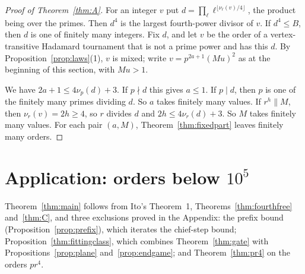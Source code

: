 \documentclass[11pt]{amsart}
\theoremstyle{definition}
\theoremstyle{remark}
\begin{document}
\begin{proof}[Proof of Theorem~\ref{thm:A}]
For an integer $v$ put $d=\prod_\ell\ell^{\lfloor\nu_\ell(v)/4\rfloor}$, the product being over the primes. Then $d^4$ is the largest fourth-power divisor of $v$. If $d^4\le B$, then $d$ is one of finitely many integers. Fix $d$, and let $v$ be the order of a vertex-transitive Hadamard tournament that is not a prime power and has this $d$. By Proposition~\ref{prop:laws}(1), $v$ is mixed; write $v=p^{2a+1}(Mu)^2$ as at the beginning of this section, with $Mu>1$.

We have $2a+1\le4\nu_p(d)+3$. If $p\nmid d$ this gives $a\le1$. If $p\mid d$, then $p$ is one of the finitely many primes dividing $d$. So $a$ takes finitely many values. If $r^h\parallel M$, then $\nu_r(v)=2h\ge4$, so $r$ divides $d$ and $2h\le4\nu_r(d)+3$. So $M$ takes finitely many values. For each pair $(a,M)$, Theorem~\ref{thm:fixedpart} leaves finitely many orders.
\end{proof}

\section{Application: orders below \texorpdfstring{$10^5$}{100000}}\label{sec:census}

Theorem~\ref{thm:main} follows from Ito's Theorem~1, Theorems~\ref{thm:fourthfree} and~\ref{thm:C}, and three exclusions proved in the Appendix: the prefix bound (Proposition~\ref{prop:prefix}), which iterates the chief-step bound; Proposition~\ref{thm:fittingclass}, which combines Theorem~\ref{thm:gate} with Propositions~\ref{prop:plane} and~\ref{prop:endgame}; and Theorem~\ref{thm:pr4} on the orders $pr^4$.
\end{document}
